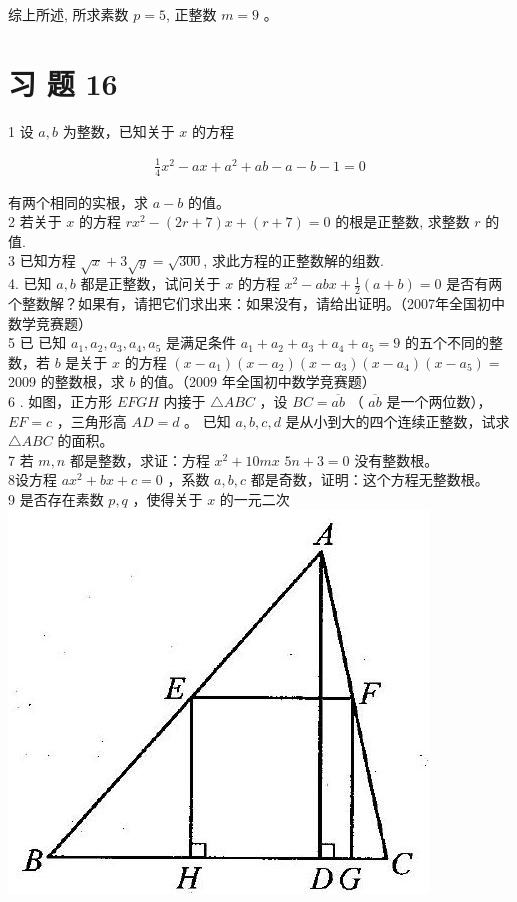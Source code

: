 \documentclass[10pt]{article}
\begin{document}
综上所述, 所求素数 $p=5$, 正整数 $m=9$ 。

\section*{习 题 16}
1 设 $a, b$ 为整数，已知关于 $x$ 的方程

\begin{align*}
\frac{1}{4} x^{2}-a x+a^{2}+a b-a-b-1=0
\end{align*}

有两个相同的实根，求 $a-b$ 的值。\\
2 若关于 $x$ 的方程 $r x^{2}-(2 r+7) x+(r+7)=0$ 的根是正整数, 求整数 $r$ 的值.\\
3 已知方程 $\sqrt{x}+3 \sqrt{y}=\sqrt{300}$, 求此方程的正整数解的组数.\\
4. 已知 $a, b$ 都是正整数，试问关于 $x$ 的方程 $x^{2}-a b x+\frac{1}{2}(a+b)=0$ 是否有两个整数解？如果有，请把它们求出来：如果没有，请给出证明。（2007年全国初中数学竞赛题）\\
5 已 已知 $a_{1}, a_{2}, a_{3}, a_{4}, a_{5}$ 是满足条件 $a_{1}+a_{2}+a_{3}+a_{4}+a_{5}=9$ 的五个不同的整数，若 $b$ 是关于 $x$ 的方程 $\left(x-a_{1}\right)\left(x-a_{2}\right)\left(x-a_{3}\right)\left(x-a_{4}\right)\left(x-a_{5}\right)=$ 2009 的整数根，求 $b$ 的值。（2009 年全国初中数学竞赛题）\\
6 . 如图，正方形 $E F G H$ 内接于 $\triangle A B C$ ，设 $B C=\overline{a b}$ （ $\overline{a b}$ 是一个两位数）， $E F=c$ ，三角形高 $A D=d$ 。 已知 $a, b, c, d$ 是从小到大的四个连续正整数，试求 $\triangle A B C$ 的面积。\\
7 若 $m, n$ 都是整数，求证：方程 $x^{2}+10 m x$ $5 n+3=0$ 没有整数根。\\
8设方程 $a x^{2}+b x+c=0$ ，系数 $a, b, c$ 都是奇数，证明：这个方程无整数根。\\
9 是否存在素数 $p, q$ ，使得关于 $x$ 的一元二次\\
\includegraphics[max width=\textwidth, center]{2024_10_30_26b590fd1106d28139f0g-107}
\end{document}
